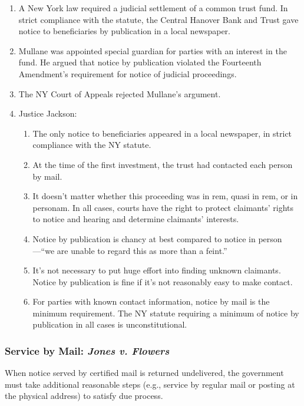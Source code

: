 \begin{enumerate}
    \item A New York law required a judicial settlement of a common trust 
    fund. In strict compliance with the statute, the Central Hanover Bank and 
    Trust gave notice to beneficiaries by publication in a local newspaper.  
    \item Mullane was appointed special guardian for parties with an interest 
    in the fund. He argued that notice by publication violated the Fourteenth 
    Amendment's requirement for notice of judicial proceedings.
    \item The NY Court of Appeals rejected Mullane's argument.
    \item Justice Jackson:
    \begin{enumerate}
        \item The only notice to beneficiaries appeared in a local newspaper, 
        in strict compliance with the NY statute.
        \item At the time of the first investment, the trust had contacted 
        each person by mail.
        \item It doesn't matter whether this proceeding was in rem, 
        quasi in rem, or in personam. In all cases, courts have 
        the right to protect claimants' rights to notice and hearing and 
        determine claimants' interests.
        \item Notice by publication is chancy at best compared to notice in 
        person---``we are unable to regard this as more than a feint.''
        \item It's not necessary to put huge effort into finding unknown 
        claimants. Notice by publication is fine if it's not reasonably easy 
        to make contact.
        \item For parties with known contact information, notice by mail is 
        the minimum requirement. The NY statute requiring a minimum of notice 
        by publication in all cases is unconstitutional.
    \end{enumerate}
\end{enumerate}

\subsubsection{Service by Mail: \emph{Jones v. Flowers}}

When notice served by certified mail is returned undelivered, the government 
must take additional reasonable steps (e.g., service by regular mail or 
posting at the physical address) to satisfy due process.

